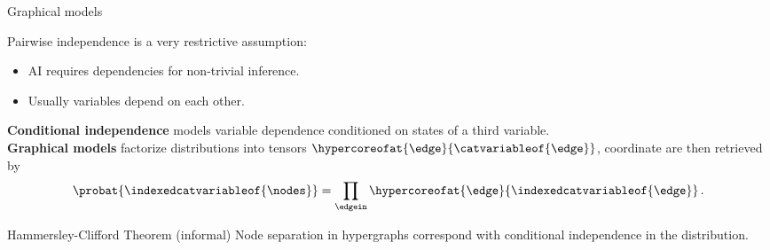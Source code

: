 \documentclass{beamer}
\begin{document}
    \begin{frame}{Graphical models}

        Pairwise independence is a very restrictive assumption:
        \begin{itemize}
            \item AI requires dependencies for non-trivial inference.
            \item Usually variables depend on each other.
        \end{itemize}
        \medskip
        {\bf Conditional independence} models variable dependence conditioned on states of a third variable. \\
        \medskip
        {\bf Graphical models} factorize distributions into tensors $\hypercoreofat{\edge}{\catvariableof{\edge}}$, coordinate are then retrieved by
        \begin{align*}
            \probat{\indexedcatvariableof{\nodes}}
            = \prod_{\edgein} \hypercoreofat{\edge}{\indexedcatvariableof{\edge}} \, .
        \end{align*}

        \begin{block}{Hammersley-Clifford Theorem (informal)}
            Node separation in hypergraphs correspond with conditional independence in the distribution.
        \end{block}


    \end{frame}
\end{document}
